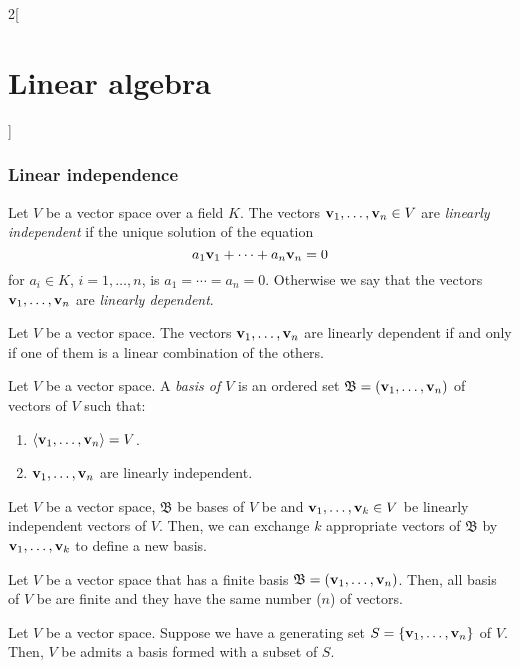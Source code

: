 \documentclass[../../../main.tex]{subfiles}
\begin{document}
\begin{multicols}{2}[\section{Linear algebra}]
    \subsubsection*{Linear independence}
    \begin{definition}
        Let $V$ be a vector space over a field $K$. The vectors $\boldsymbol{\mathrm{v}}_1,\ldots,\boldsymbol{\mathrm{v}}_n\in V$ are \textit{linearly independent} if the unique solution of the equation $$a_1\boldsymbol{\mathrm{v}}_1+\cdots+a_n\boldsymbol{\mathrm{v}}_n=0$$ for $a_i\in K$, $i=1,\ldots,n$, is $a_1=\cdots=a_n=0$. Otherwise we say that the vectors $\boldsymbol{\mathrm{v}}_1,\ldots,\boldsymbol{\mathrm{v}}_n$ are \textit{linearly dependent}.
    \end{definition}
    \begin{lemma}
        Let $V$ be a vector space. The vectors $\boldsymbol{\mathrm{v}}_1,\ldots,\boldsymbol{\mathrm{v}}_n$ are linearly dependent if and only if one of them is a linear combination of the others.
    \end{lemma}
    \begin{definition}
        Let $V$ be a vector space. A \textit{basis of $V$} is an ordered set $\mathfrak{B}=(\boldsymbol{\mathrm{v}}_1,\ldots,\boldsymbol{\mathrm{v}}_n)$ of vectors of $V$ such that:
        \begin{enumerate}
            \item $\langle \boldsymbol{\mathrm{v}}_1,\ldots,\boldsymbol{\mathrm{v}}_n\rangle = V$.
            \item $\boldsymbol{\mathrm{v}}_1,\ldots,\boldsymbol{\mathrm{v}}_n$ are linearly independent.
        \end{enumerate}
    \end{definition}
    \begin{lemma}
        Let $V$ be a vector space, $\mathfrak{B}$ be bases of $V$ be and $\boldsymbol{\mathrm{v}}_1,\ldots,\boldsymbol{\mathrm{v}}_k\in V$ be linearly independent vectors of $V$. Then, we can exchange $k$ appropriate vectors of $\mathfrak{B}$ by $\boldsymbol{\mathrm{v}}_1,\ldots,\boldsymbol{\mathrm{v}}_k$ to define a new basis.
    \end{lemma}
    \begin{corollary}
        Let $V$ be a vector space that has a finite basis $\mathfrak{B}=(\boldsymbol{\mathrm{v}}_1,\ldots,\boldsymbol{\mathrm{v}}_n)$. Then, all basis of $V$ be are finite and they have the same number ($n$) of vectors.
    \end{corollary}
    \begin{lemma}
        Let $V$ be a vector space. Suppose we have a generating set $S=\{\boldsymbol{\mathrm{v}}_1,\ldots,\boldsymbol{\mathrm{v}}_n\}$ of $V$. Then, $V$ be admits a basis formed with a subset of $S$.

\end{lemma}
\end{multicols}
\end{document}
